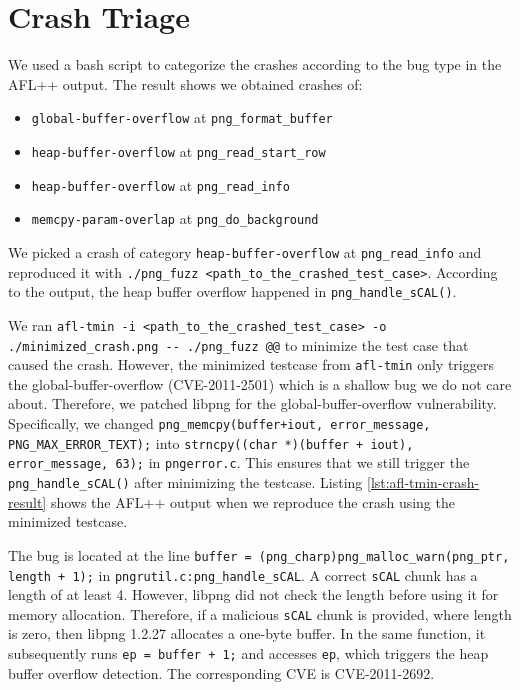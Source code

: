 \documentclass[letterpaper,twocolumn,10pt]{article}
\begin{document}
\section{Crash Triage}
\label{sec:q5}


We used a bash script to categorize the crashes according to the bug type in the AFL++ output. The result shows we obtained crashes of:
\begin{itemize}
    \item \lstinline|global-buffer-overflow| at \lstinline|png_format_buffer|
    \item  \lstinline|heap-buffer-overflow| at \lstinline|png_read_start_row| 
    \item  \lstinline|heap-buffer-overflow| at \lstinline|png_read_info|
    \item \lstinline|memcpy-param-overlap| at \lstinline|png_do_background|
\end{itemize}

We picked a crash of category \lstinline|heap-buffer-overflow| at \lstinline|png_read_info| and reproduced it with \lstinline|./png_fuzz <path_to_the_crashed_test_case>|. According to the output, the heap buffer overflow happened in \lstinline|png_handle_sCAL()|.

We ran \lstinline|afl-tmin -i <path_to_the_crashed_test_case> -o ./minimized_crash.png -- ./png_fuzz @@| to minimize the test case that caused the crash. However, the minimized testcase from \lstinline|afl-tmin| only triggers the global-buffer-overflow (CVE-2011-2501) which is a shallow bug we do not care about. 
Therefore, we patched libpng for the global-buffer-overflow vulnerability. Specifically, we changed \lstinline|png_memcpy(buffer+iout, error_message, PNG_MAX_ERROR_TEXT);| into \lstinline|strncpy((char *)(buffer + iout), error_message, 63);| in \lstinline|pngerror.c|. This ensures that we still trigger the \lstinline|png_handle_sCAL()| after minimizing the testcase. Listing \ref{lst:afl-tmin-crash-result} shows the AFL++ output when we reproduce the crash using the minimized testcase.

The bug is located at the line \lstinline|buffer = (png_charp)png_malloc_warn(png_ptr, length + 1);| in \lstinline|pngrutil.c:png_handle_sCAL|. A correct \lstinline|sCAL| chunk has a length of at least 4. However, libpng did not check the length before using it for memory allocation. Therefore, if a malicious \lstinline|sCAL|  chunk is provided, where length is zero, then libpng 1.2.27 allocates a one-byte buffer. In the same function, it subsequently runs \lstinline|ep = buffer + 1;| and accesses \lstinline|ep|, which triggers the heap buffer overflow detection. The corresponding CVE is CVE-2011-2692.
\end{document}
